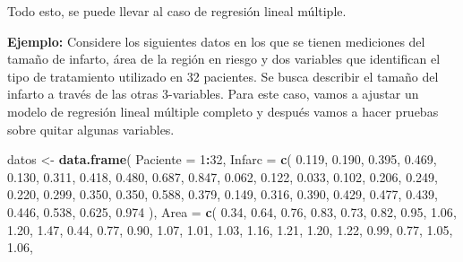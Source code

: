 \documentclass[
]{book}
\newenvironment{Shaded}{\begin{snugshade}}{\end{snugshade}}
\newcommand{\AttributeTok}[1]{\textcolor[rgb]{0.13,0.29,0.53}{#1}}
\newcommand{\DecValTok}[1]{\textcolor[rgb]{0.00,0.00,0.81}{#1}}
\newcommand{\FloatTok}[1]{\textcolor[rgb]{0.00,0.00,0.81}{#1}}
\newcommand{\FunctionTok}[1]{\textcolor[rgb]{0.13,0.29,0.53}{\textbf{#1}}}
\newcommand{\NormalTok}[1]{#1}
\newcommand{\OtherTok}[1]{\textcolor[rgb]{0.56,0.35,0.01}{#1}}
\newcommand{\SpecialCharTok}[1]{\textcolor[rgb]{0.81,0.36,0.00}{\textbf{#1}}}
\begin{document}
Todo esto, se puede llevar al caso de regresión lineal múltiple.

\textbf{Ejemplo:} Considere los siguientes datos en los que se tienen mediciones del tamaño de infarto, área de la región en riesgo y dos variables que identifican el tipo de tratamiento utilizado en 32 pacientes. Se busca describir el tamaño del infarto a través de las otras 3-variables. Para este caso, vamos a ajustar un modelo de regresión lineal múltiple completo y después vamos a hacer pruebas sobre quitar algunas variables.

\begin{Shaded}
\begin{Highlighting}[]
\NormalTok{datos }\OtherTok{\textless{}{-}} \FunctionTok{data.frame}\NormalTok{(}
  \AttributeTok{Paciente =} \DecValTok{1}\SpecialCharTok{:}\DecValTok{32}\NormalTok{,}
  \AttributeTok{Infarc =} \FunctionTok{c}\NormalTok{(}
    \FloatTok{0.119}\NormalTok{, }\FloatTok{0.190}\NormalTok{, }\FloatTok{0.395}\NormalTok{, }\FloatTok{0.469}\NormalTok{, }\FloatTok{0.130}\NormalTok{, }\FloatTok{0.311}\NormalTok{, }\FloatTok{0.418}\NormalTok{, }\FloatTok{0.480}\NormalTok{,}
    \FloatTok{0.687}\NormalTok{, }\FloatTok{0.847}\NormalTok{, }\FloatTok{0.062}\NormalTok{, }\FloatTok{0.122}\NormalTok{, }\FloatTok{0.033}\NormalTok{, }\FloatTok{0.102}\NormalTok{, }\FloatTok{0.206}\NormalTok{, }\FloatTok{0.249}\NormalTok{,}
    \FloatTok{0.220}\NormalTok{, }\FloatTok{0.299}\NormalTok{, }\FloatTok{0.350}\NormalTok{, }\FloatTok{0.350}\NormalTok{, }\FloatTok{0.588}\NormalTok{, }\FloatTok{0.379}\NormalTok{, }\FloatTok{0.149}\NormalTok{, }\FloatTok{0.316}\NormalTok{,}
    \FloatTok{0.390}\NormalTok{, }\FloatTok{0.429}\NormalTok{, }\FloatTok{0.477}\NormalTok{, }\FloatTok{0.439}\NormalTok{, }\FloatTok{0.446}\NormalTok{, }\FloatTok{0.538}\NormalTok{, }\FloatTok{0.625}\NormalTok{, }\FloatTok{0.974}
\NormalTok{  ),}
  \AttributeTok{Area =} \FunctionTok{c}\NormalTok{(}
    \FloatTok{0.34}\NormalTok{, }\FloatTok{0.64}\NormalTok{, }\FloatTok{0.76}\NormalTok{, }\FloatTok{0.83}\NormalTok{, }\FloatTok{0.73}\NormalTok{, }\FloatTok{0.82}\NormalTok{, }\FloatTok{0.95}\NormalTok{, }\FloatTok{1.06}\NormalTok{,}
    \FloatTok{1.20}\NormalTok{, }\FloatTok{1.47}\NormalTok{, }\FloatTok{0.44}\NormalTok{, }\FloatTok{0.77}\NormalTok{, }\FloatTok{0.90}\NormalTok{, }\FloatTok{1.07}\NormalTok{, }\FloatTok{1.01}\NormalTok{, }\FloatTok{1.03}\NormalTok{,}
    \FloatTok{1.16}\NormalTok{, }\FloatTok{1.21}\NormalTok{, }\FloatTok{1.20}\NormalTok{, }\FloatTok{1.22}\NormalTok{, }\FloatTok{0.99}\NormalTok{, }\FloatTok{0.77}\NormalTok{, }\FloatTok{1.05}\NormalTok{, }\FloatTok{1.06}\NormalTok{,}

\end{Highlighting}
\end{Shaded}
\end{document}
